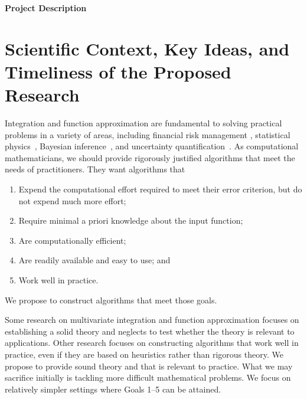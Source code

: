 \documentclass[11pt]{NSFamsart}
\begin{document}

\centerline{\Large \textbf{Project Description}}
\vspace{-2ex}

\setcounter{tocdepth}{1}
\tableofcontents

\vspace{-6ex}

\section{Scientific Context, Key Ideas,  and Timeliness of the Proposed Research}
Integration and function approximation are fundamental to
solving practical problems in a variety of areas, including financial risk management \cite{Gla03}, 
statistical physics~\cite{LanBin14}, 
Bayesian inference~\cite{GelEtal13}, and uncertainty quantification~\cite{ForEtal09, Smi14a}.  As computational mathematicians, we should provide rigorously justified algorithms that meet the needs of practitioners.  They want algorithms that 
\begin{enumerate}[leftmargin = 15ex]
\renewcommand{\labelenumi}{\textbf{Goal \arabic{enumi}.}}
    \item \label{GoalOne} Expend the  
computational effort required to meet their error criterion, but do not expend much more effort;
\item Require minimal a priori knowledge about the input function;

\item Are computationally efficient;

\item Are readily available and easy to use; and

\item Work well in practice.
\end{enumerate}
We propose to construct algorithms that meet those goals.

Some research on multivariate integration and function approximation focuses on establishing a solid theory and neglects to test whether the theory is relevant to applications.  Other research focuses on constructing algorithms that work well in practice, even if they are based on heuristics rather than rigorous theory.  We propose to provide sound theory and that is relevant to practice.  What we may sacrifice initially is tackling more difficult mathematical problems.  We focus on  relatively simpler settings where Goals 1--5 can be attained.
\end{document}
